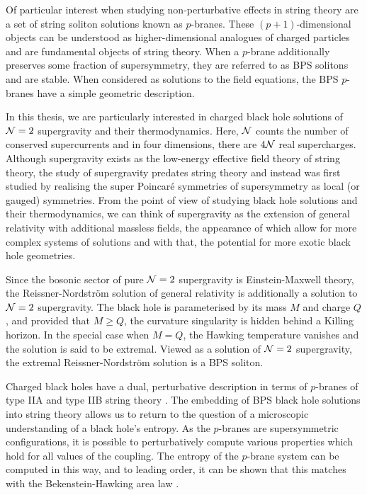 Of particular interest when studying non-perturbative effects in string theory are a set of string soliton solutions known as $p$-branes. These $(p+1)$-dimensional objects can be understood as higher-dimensional analogues of charged particles and are fundamental objects of string theory. When a $p$-brane additionally preserves some fraction of supersymmetry, they are referred to as BPS solitons and are stable. When considered as solutions to the field equations, the BPS $p$-branes have a simple geometric description.  

In this thesis, we are particularly interested in charged black hole solutions of ${\cal N} = 2$ supergravity and their thermodynamics. Here, ${\cal N}$ counts the number of conserved supercurrents and in four dimensions, there are $4{\cal N}$ real supercharges. Although supergravity exists as the low-energy effective field theory of string theory, the study of supergravity predates string theory and instead was first studied by realising the super Poincar\'e symmetries of supersymmetry as local (or gauged) symmetries. From the point of view of studying black hole solutions and their thermodynamics, we can think of supergravity as the extension of general relativity with additional massless fields, the appearance of which allow for more complex systems of solutions and with that, the potential for more exotic black hole geometries. 

Since the bosonic sector of pure ${\cal N}=2$ supergravity is Einstein-Maxwell theory, the Reissner-Nordstr\"om solution of general relativity is additionally a solution to ${\cal N} = 2$ supergravity. The black hole is parameterised by its mass $M$ and charge $Q$, and provided that $M \geq Q$, the curvature singularity is hidden behind a Killing horizon. In the special case when $M = Q$, the Hawking temperature vanishes and the solution is said to be extremal. Viewed as a solution of ${\cal N} = 2$ supergravity, the extremal Reissner-Nordstr\"om solution is a BPS soliton. 

Charged black holes have a dual, perturbative description in terms of $p$-branes of type IIA and type IIB string theory \cite{Polchinski:1995mt}. The embedding of BPS black hole solutions into string theory allows us to return to the question of a microscopic understanding of a black hole's entropy. As the $p$-branes are supersymmetric configurations, it is possible to perturbatively compute various properties which hold for all values of the coupling. The entropy of the $p$-brane system can be computed in this way, and to leading order, it can be shown that this matches with the Bekenstein-Hawking area law \cite{Strominger:1996sh, Strominger:1996kf}.

